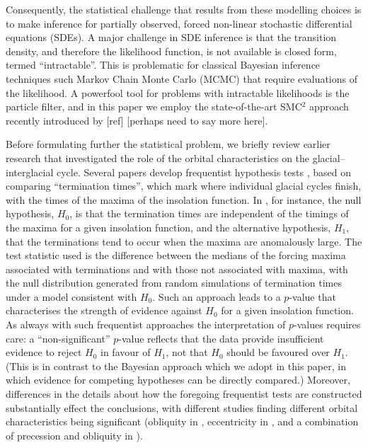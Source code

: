 \documentclass[a4paper,12pt]{article}
\begin{document}
Consequently, the
statistical challenge that results from these modelling choices is to make 
inference for partially observed, forced
non-linear stochastic differential equations (SDEs).  A major challenge in SDE inference 
is that the transition density, and therefore the likelihood function, is not
available is closed form, termed ``intractable''.  
This is problematic for classical Bayesian inference
techniques such Markov Chain Monte Carlo (MCMC) that require evaluations of the
likelihood.  A powerfool tool for problems with intractable likelihoods is the particle
filter, and in this paper we employ the state-of-the-art SMC$^2$ approach recently
introduced by [ref] [perhaps need to say more here].



Before formulating further the statistical problem, we briefly review earlier research that
investigated the role of the orbital characteristics on the glacial--interglacial cycle.
Several papers develop frequentist hypothesis tests
\cite{Huybers2005,Lisiecki2010,Huybers2011}, based on comparing ``termination times'', which
mark where individual glacial cycles finish, with the times of the maxima of the insolation
function.  In \cite{Huybers2011}, for instance, the null hypothesis, $H_0$, is that the
termination times are independent of the timings of the maxima for a given insolation
function, and the alternative hypothesis, $H_1$, that the terminations tend to occur when
the maxima are anomalously large.  The test statistic used is the difference between the
medians of the forcing maxima associated with terminations and with those not associated
with maxima, with the null distribution generated from random simulations of termination
times under a model consistent with $H_0$.  Such an approach leads to a $p$-value that
characterises the strength of evidence against $H_0$ for a given insolation function.  
As always with such frequentist approaches the interpretation of $p$-values requires care: a
``non-significant'' $p$-value reflects that the data provide insufficient evidence to reject
$H_0$ in favour of $H_1$, not that $H_0$ should be favoured over $H_1$.  (This is in
contrast to the Bayesian approach which we adopt in this paper, in which evidence for
competing hypotheses can be directly compared.)  Moreover, differences in the details about
how the foregoing frequentist tests are constructed substantially effect the conclusions,
with different studies finding different orbital characteristics being significant
(obliquity in \cite{Huybers2005}, eccentricity in \cite{Lisiecki2010}, and a combination of
precession and obliquity in \cite{Huybers2011}).
\end{document}
